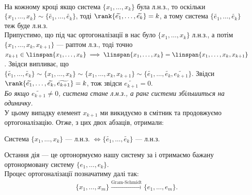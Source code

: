 \documentclass{math_library}
\begin{document}
\bigskip \\
На кожному кроці якщо система $\{x_1,\dots,x_k\}$ була л.н.з., то оскільки $\{x_1,\dots,x_k\} \sim \{\widetilde{e_1},\dots,\widetilde{e_k}\}$, тоді $\rank \{\widetilde{e_1},\dots,\widetilde{e_k}\} = k$, а тому система $\{\widetilde{e_1},\dots,\widetilde{e_k}\}$ теж буде л.н.з.
\bigskip \\
Припустимо, що під час ортогоналізації в нас було $\{x_1,\dots,x_k\}$ л.н.з., а потім $\{x_1,\dots,x_k, x_{k+1}\}$ --- раптом л.з., тоді точно $x_{k+1} \in \linspan \{x_1,\dots,x_k\} \implies \linspan \{x_1,\dots,x_k\} = \linspan \{x_1,\dots,x_k,x_{k+1}\}$. Звідси випливає, що $\{\widetilde{e_1},\dots,\widetilde{e_k}\} \sim \{x_1,\dots,x_k\} \sim \{x_1,\dots,x_k,x_{k+1}\} \sim \{\widetilde{e_1},\dots,\widetilde{e_k},\widetilde{e_{k+1}}\}$. Звідси $\rank \{\widetilde{e_1},\dots,\widetilde{e_k},\widetilde{e_{k+1}}\} = k$, тож звідси $\widetilde{e_{k+1}} = 0$.\\
\textit{Бо якщо $\widetilde{e_{k+1}} \neq 0$, система стане л.н.з., а ранг системи збільшиться на одиничку.}\\
У цьому випадку елемент $x_{k+1}$ ми викидуємо в смітник та продовжуємо ортогоналізацію. Отже, з цих двох абзаців, отримали:

\begin{corollary}
Система $\{x_1,\dots,x_k\}$ --- л.н.з. $\iff \{\widetilde{e_1},\dots,\widetilde{e_k}\}$ --- л.н.з.
\end{corollary}
\noindent
Остання дія --- це ортонормуємо нашу систему за  і отримаємо бажану ортонормовану систему $\{e_1,\dots,e_k\}$.
\bigskip \\
Процес ортогоналізації позначатиму далі так:
\begin{align*}
\{x_1,\dots,x_m\} \xrightarrow{\text{Gram-Schmidt}} \{e_1,\dots,e_m\}.
\end{align*}
\end{document}
